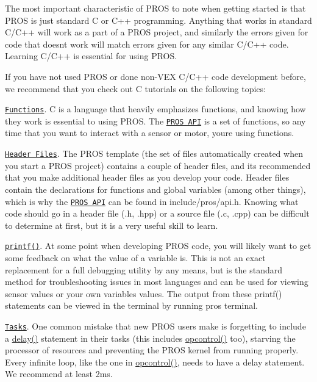 The most important characteristic of P\+R\+OS to note when getting started is that P\+R\+OS is just standard C or C++ programming. Anything that works in standard C/\+C++ will work as a part of a P\+R\+OS project, and similarly the errors given for code that doesn\textquotesingle{}t work will match errors given for any similar C/\+C++ code. Learning C/\+C++ is essential for using P\+R\+OS.

If you have not used P\+R\+OS or done non-\/\+V\+EX C/\+C++ code development before, we recommend that you check out C tutorials on the following topics\+:


\begin{DoxyItemize}
\item \href{http://www.studytonight.com/c/user-defined-functions-in-c.php}{\tt Functions}. C is a language that heavily emphasizes functions, and knowing how they work is essential to using P\+R\+OS. The \href{../api/index.html}{\tt P\+R\+OS A\+PI} is a set of functions, so any time that you want to interact with a sensor or motor, you\textquotesingle{}re using functions.
\item \href{https://www.tutorialspoint.com/cprogramming/c_header_files.htm}{\tt Header Files}. The P\+R\+OS template (the set of files automatically created when you start a P\+R\+OS project) contains a couple of header files, and it\textquotesingle{}s recommended that you make additional header files as you develop your code. Header files contain the declarations for functions and global variables (among other things), which is why the \href{../api/index.html}{\tt P\+R\+OS A\+PI} can be found in {\ttfamily include/pros/api.\+h}. Knowing what code should go in a header file ({\ttfamily .h}, {\ttfamily .hpp}) or a source file ({\ttfamily .c}, {\ttfamily .cpp}) can be difficult to determine at first, but it is a very useful skill to learn.
\item \href{https://www.codingunit.com/printf-format-specifiers-format-conversions-and-formatted-output}{\tt printf()}. At some point when developing P\+R\+OS code, you will likely want to get some feedback on what the value of a variable is. This is not an exact replacement for a full debugging utility by any means, but is the standard method for troubleshooting issues in most languages and can be used for viewing sensor values or your own variables\textquotesingle{} values. The output from these {\ttfamily printf()} statements can be viewed in the terminal by running {\ttfamily pros terminal}.
\item \href{../tutorials/topical/multitasking.html}{\tt Tasks}. One common mistake that new P\+R\+OS users make is forgetting to include a {\ttfamily \hyperlink{rtos_8h_ab8c5a8048d5576a33d7f79b95a2fa0dd}{delay()}} statement in their tasks (this includes {\ttfamily \hyperlink{main_8h_a1903abdb5ef0f301d660754c8315fc17}{opcontrol()}} too), starving the processor of resources and preventing the P\+R\+OS kernel from running properly. Every infinite loop, like the one in {\ttfamily \hyperlink{main_8h_a1903abdb5ef0f301d660754c8315fc17}{opcontrol()}}, needs to have a delay statement. We recommend at least 2ms.
\end{DoxyItemize}

